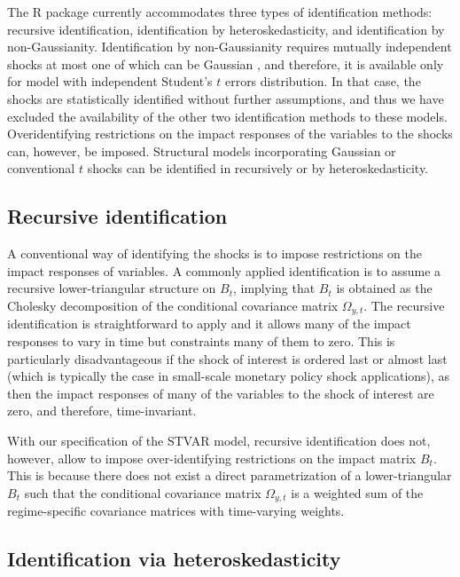 \documentclass[nojss]{jss}
\begin{document}
The R package  currently accommodates three types of identification methods: recursive identification, identification by heteroskedasticity, and identification by non-Gaussianity. Identification by non-Gaussianity requires mutually independent shocks at most one of which can be Gaussian \citep{Virolainen2:2024}, and therefore, it is available only for model with independent Student's $t$ errors distribution. In that case, the shocks are statistically identified without further assumptions, and thus we have excluded the availability of the other two identification methods to these models. Overidentifying restrictions on the impact responses of the variables to the shocks can, however, be imposed. Structural models incorporating Gaussian or conventional $t$ shocks can be identified in  recursively or by heteroskedasticity.


\subsection{Recursive identification}

A conventional way of identifying the shocks is to impose restrictions on the impact responses of variables. A commonly applied identification is to assume a recursive lower-triangular structure on $B_t$, implying that $B_t$ is obtained as the Cholesky decomposition of the conditional covariance matrix $\Omega_{y,t}$. The recursive identification is straightforward to apply and it allows many of the impact responses to vary in time but constraints many of them to zero. This is particularly disadvantageous if the shock of interest is ordered last or almost last (which is typically the case in small-scale monetary policy shock applications), as then the impact responses of many of the variables to the shock of interest are zero, and therefore, time-invariant.

With our specification of the STVAR model, recursive identification does not, however, allow to impose over-identifying restrictions on the impact matrix $B_t$. This is because there does not exist a direct parametrization of a lower-triangular $B_t$ such that the conditional covariance matrix $\Omega_{y,t}$ is a weighted sum of the regime-specific covariance matrices with time-varying weights.

\subsection{Identification via heteroskedasticity}
\end{document}
